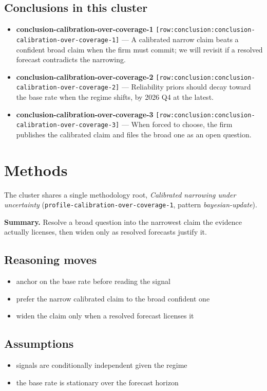 \documentclass[11pt,letterpaper]{article}
\newcommand{\rowref}[1]{\texttt{\small[row:#1]}}
\begin{document}
\subsection*{Conclusions in this cluster}
\begin{itemize}[leftmargin=1.5em]
  \item \textbf{conclusion-calibration-over-coverage-1} \rowref{conclusion:conclusion-calibration-over-coverage-1} --- A calibrated narrow claim beats a confident broad claim when the firm must commit; we will revisit if a resolved forecast contradicts the narrowing.
  \item \textbf{conclusion-calibration-over-coverage-2} \rowref{conclusion:conclusion-calibration-over-coverage-2} --- Reliability priors should decay toward the base rate when the regime shifts, by 2026 Q4 at the latest.
  \item \textbf{conclusion-calibration-over-coverage-3} \rowref{conclusion:conclusion-calibration-over-coverage-3} --- When forced to choose, the firm publishes the calibrated claim and files the broad one as an open question.
\end{itemize}

\section{Methods}
The cluster shares a single methodology root,
\textit{Calibrated narrowing under uncertainty} (\texttt{profile-calibration-over-coverage-1}, pattern \emph{bayesian-update}).

\textbf{Summary.} Resolve a broad question into the narrowest claim the evidence actually licenses, then widen only as resolved forecasts justify it.

\subsection*{Reasoning moves}
\begin{itemize}[leftmargin=1.5em]
  \item anchor on the base rate before reading the signal
  \item prefer the narrow calibrated claim to the broad confident one
  \item widen the claim only when a resolved forecast licenses it
\end{itemize}
\subsection*{Assumptions}
\begin{itemize}[leftmargin=1.5em]
  \item signals are conditionally independent given the regime
  \item the base rate is stationary over the forecast horizon
\end{itemize}
\end{document}
